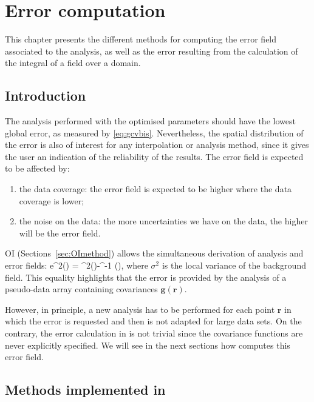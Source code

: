 \chapter{Error computation\label{chap:error}}

This chapter presents the different methods for computing the error field associated to the analysis, as well as the error resulting from the calculation of the integral of a field over a domain.

\minitoc

\section{Introduction}

The analysis performed with the optimised parameters should have the lowest global error, as measured by \eqref{eq:gcvbis}. Nevertheless, the spatial distribution of the error is also of interest for any interpolation or analysis method, since it gives the user an indication of the reliability of the results. The error field is expected to be affected by:
\begin{enumerate}
\item the data coverage: the error field is expected to be higher where the data coverage is lower;
\item the noise on the data: the more uncertainties we have on the data, the higher will be the error field.
\end{enumerate}


OI (Sections~\ref{sec:OImethod})  allows the simultaneous derivation of analysis and error fields:
\be
e^{2}() = \sigma^{2}()-^{-1}  (),
\label{eq:erroroi}
\ee
where $\sigma^{2}$ is the local variance of the background field. This equality highlights that the error is provided by the analysis of a pseudo-data array containing covariances $\mathbf{g}(\mathbf{r})$. 

However, in principle, a new analysis has to be performed for each point $\mathbf{r}$ in which the error is requested and then is not adapted for large data sets. On the contrary, the error calculation in \diva is not trivial since the covariance functions are never explicitly specified. We will see in the next sections how \diva computes this error field.

\section{Methods implemented in \diva}

